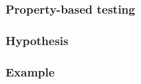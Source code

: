 \documentclass[compress]{beamer}
\begin{document}
\begin{frame}[fragile]
\frametitle{Property-based testing}

\end{frame}

\begin{frame}[fragile]
\frametitle{Hypothesis}

\end{frame}

\begin{frame}[fragile]
\frametitle{Example}

\end{frame}
\end{document}

